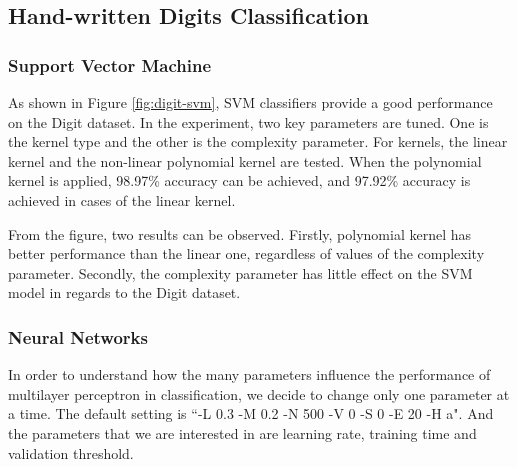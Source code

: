 \documentclass[11pt]{article}
\begin{document}

\subsection{Hand-written Digits Classification}
\subsubsection{Support Vector Machine}

As shown in Figure \ref{fig:digit-svm}, SVM classifiers provide a good performance on the Digit dataset. In the experiment, two key parameters are tuned. One is the kernel type and the other is the complexity parameter. For kernels, the linear kernel and the non-linear polynomial kernel are tested. When the polynomial kernel is applied, 98.97\% accuracy can be achieved, and 97.92\% accuracy is achieved in cases of the linear kernel. 

From the figure, two results can be observed. Firstly, polynomial kernel has better performance than the linear one, regardless of values of the complexity parameter. Secondly, the complexity parameter has little effect on the SVM model in regards to the Digit dataset. 

\subsubsection{Neural Networks}
In order to understand how the many parameters influence the performance of multilayer perceptron in classification, we decide to change only one parameter at a time. The default setting is ``-L 0.3 -M 0.2 -N 500 -V 0 -S 0 -E 20 -H a". And the parameters that we are interested in are learning rate, training time and validation threshold.
\end{document}

